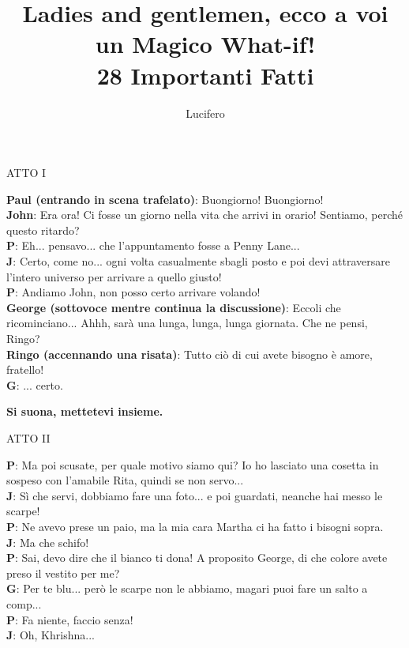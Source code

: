 \documentclass{article}
\title{
Ladies and gentlemen, ecco a voi un Magico What-if!\\\vspace{0.3cm}
\large 28 Importanti Fatti}
\author{Lucifero}
\date{}
\begin{document}
\maketitle
\begin{center}
{\large ATTO I\\}
\end{center}
{\bf Paul (entrando in scena trafelato)}: Buongiorno! Buongiorno!\\
{\bf John}: Era ora! Ci fosse un giorno nella vita che arrivi in orario! Sentiamo, perché questo ritardo?\\
{\bf P}: Eh... pensavo... che l'appuntamento fosse a Penny Lane...\\
{\bf J}: Certo, come no... ogni volta casualmente sbagli posto e poi devi attraversare l'intero universo per arrivare a quello giusto!\\
{\bf P}: Andiamo John, non posso certo arrivare volando!\\
{\bf George (sottovoce mentre continua la discussione)}: Eccoli che ricominciano... Ahhh, sarà una lunga, lunga, lunga giornata. Che ne pensi, Ringo?\\
{\bf Ringo (accennando una risata)}: Tutto ciò di cui avete bisogno è amore, fratello!\\
{\bf G}: ... certo.
\begin{center}
{\bf Si suona, mettetevi insieme.\\}
\end{center}
\vspace{0.3cm}
\begin{center}
{\large ATTO II\\}
\end{center}
{\bf P}: Ma poi scusate, per quale motivo siamo qui? Io ho lasciato una cosetta in sospeso con l'amabile Rita, quindi se non servo...\\
{\bf J}: Sì che servi, dobbiamo fare una foto... e poi guardati, neanche hai messo le scarpe!\\
{\bf P}: Ne avevo prese un paio, ma la mia cara Martha ci ha fatto i bisogni sopra.\\
{\bf J}: Ma che schifo!\\
{\bf P}: Sai, devo dire che il bianco ti dona! A proposito George, di che colore avete preso il vestito per me?\\
{\bf G}: Per te blu... però le scarpe non le abbiamo, magari puoi fare un salto a comp...\\
{\bf P}: Fa niente, faccio senza!\\
{\bf J}: Oh, Khrishna...\\
\end{document}
